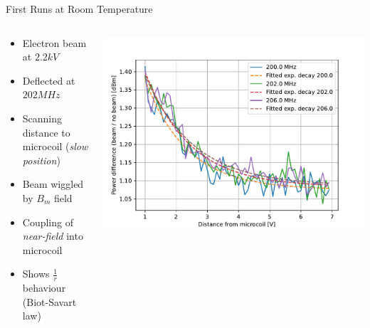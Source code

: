\documentclass[final]{beamer}
\begin{document}
\begin{frame}[fragile]{}
\begin{columns}[T]
\begin{column}{.49\linewidth}
      \begin{block}{\Large First Runs at Room Temperature}
        \begin{columns}
          \begin{column}{0.4\columnwidth}
            \begin{itemize}
                \item Electron beam at $2.2 kV$
                \item Deflected at $202 MHz$
                \item Scanning distance to microcoil (\textit{slow position})
                \item Beam wiggled by $B_m$ field
                \item Coupling of \textit{near-field} into microcoil
                \item Shows $\frac{1}{r}$ behaviour (Biot-Savart law)
            \end{itemize}
          \end{column}
          \begin{column}{0.6\columnwidth}
            \includegraphics[width=\columnwidth]{figures/beamcoupling.pdf}
          \end{column}
        \end{columns}
      \end{block}


\end{column}
\end{columns}
\end{frame}
\end{document}
